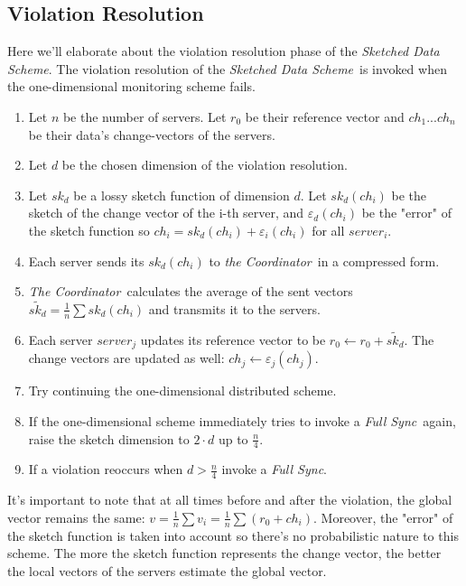 \documentclass[10pt, conference]{IEEEtran}
\newcommand{\sketchScheme}{\textit{Sketched Data Scheme}}
\newcommand{\fullSync}{\textit{Full Sync}}
\newcommand{\theCoordinator}{\textit{the Coordinator}}
\newcommand{\TheCoordinator}{\textit{The Coordinator}}
\begin{document}
\subsection{Violation Resolution}
Here we'll elaborate about the violation resolution phase of the \sketchScheme . The violation resolution of the \sketchScheme \ is invoked when the one-dimensional monitoring scheme fails. 
\begin{enumerate}
\item Let $n$ be the number of servers. Let $r_0$ be their reference vector and $ch_1 ... ch_n$ be their data's change-vectors of the servers.
\item Let $d$ be the chosen dimension of the violation resolution.
\item Let $sk_d$ be a lossy sketch function of dimension $d$. Let $sk_d (ch_i)$ be the sketch of the change vector of the i-th server, and $\varepsilon _d(ch_i)$ be the "error" of the sketch function so ${ch_i = sk_d(ch_i) + \varepsilon _i(ch_i)}$ for all $server_i$.
\item Each server sends its $sk_d(ch_i)$ to \theCoordinator \ in a compressed form.
\item \TheCoordinator \ calculates the average of the sent vectors ${\widetilde{sk_d} = \frac{1}{n}\sum sk_d(ch_i)}$ and transmits it to the servers.
\item Each server $server_j$ updates its reference vector to be ${r_0 \leftarrow r_0 + \widetilde{sk_d}}$. The change vectors are updated as well: ${ch_j \leftarrow \varepsilon _j(ch_j)}$.
\item Try continuing the one-dimensional distributed scheme.
\item If the one-dimensional scheme immediately tries to invoke a \fullSync \ again, raise the sketch dimension to $2\cdot d$ up to $\frac{n}{4}$.
\item If a violation reoccurs when ${d > \frac{n}{4}}$ invoke a \fullSync .
\end{enumerate} 
It's important to note that at all times before and after the violation, the global vector remains the same: ${v = \frac{1}{n}\sum v_i=\frac{1}{n}\sum (r_0 + ch_i)}$. Moreover, the "error" of the sketch function is taken into account so there's no probabilistic nature to this scheme. The more the sketch function represents the change vector, the  better the local vectors of the servers estimate the global vector.
\end{document}
